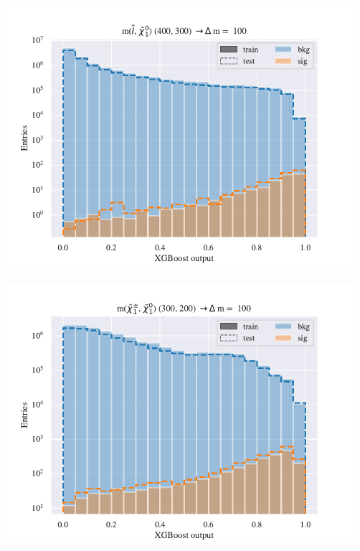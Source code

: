 \begin{figure}[H]
    \centering
    \begin{subfigure}[t!]{0.49\textwidth}
        \includegraphics[width = \textwidth]{Figures/SlepSlep/ML/BDT/High_level/Low/scaled_train_test_395984.pdf}
        \caption{}
        \label{fig:traintestscaledBDTSlepslepLow}
    \end{subfigure}
    \begin{subfigure}[t!]{0.49\textwidth}
        \includegraphics[width = \textwidth]{Figures/SlepSnu/BDT/Low_level/Low/scaled_train_test_397115.pdf}
        \caption{}
        \label{fig:traintestscaledBDTSlepsnuLow}
    \end{subfigure}
    \begin{subfigure}[t!]{0.49\textwidth}

\end{subfigure}
\end{figure}
